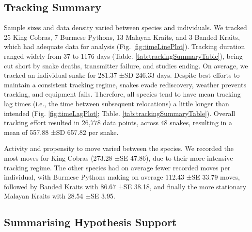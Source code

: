 \documentclass[10pt,a4paper]{article}
\begin{document}
\subsection{Tracking Summary}\label{tracking-summary}

Sample sizes and data density varied between species and individuals.
We tracked 25 King Cobras, 7 Burmese Pythons, 13 Malayan Kraits, and 3 Banded Kraits, which had adequate data for analysis (Fig. \ref{fig:timeLinePlot}).
Tracking duration ranged widely from 37 to 1176 days (Table. \ref{tab:trackingSummaryTable}), being cut short by snake deaths, transmitter failure, and studies ending.
On average, we tracked an individual snake for 281.37 ±SD 246.33 days.
Despite best efforts to maintain a consistent tracking regime, snakes evade rediscovery, weather prevents tracking, and equipment fails.
Therefore, all species tend to have mean tracking lag times (i.e., the time between subsequent relocations) a little longer than intended (Fig. \ref{fig:timeLagPlot}; Table. \ref{tab:trackingSummaryTable}).
Overall tracking effort resulted in 26,778 data points, across 48 snakes, resulting in a mean of 557.88 ±SD 657.82 per snake.

Activity and propensity to move varied between the species.
We recorded the most moves for King Cobras (273.28 ±SE 47.86), due to their more intensive tracking regime.
The other species had on average fewer recorded moves per individual, with Burmese Pythons making on average 112.43 ±SE 33.79 moves, followed by Banded Kraits with 86.67 ±SE 38.18, and finally the more stationary Malayan Kraits with 28.54 ±SE 3.95.

\subsection{Summarising Hypothesis Support}\label{summarising-hypothesis-support}
\end{document}
